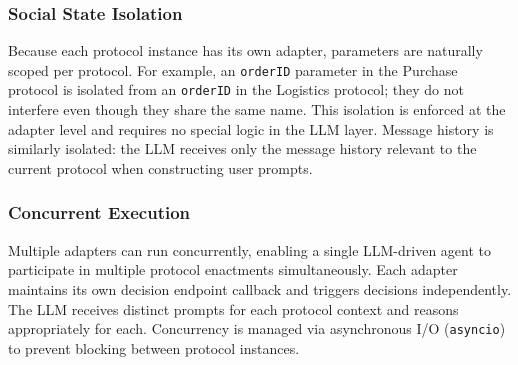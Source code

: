 \documentclass[runningheads]{llncs}
\newcommand{\ahoy}{Ahoy\xspace}
\begin{document}
\subsubsection{Social State Isolation}
Because each protocol instance has its own adapter, parameters are naturally scoped per protocol. 
For example, an \texttt{orderID} parameter in the Purchase protocol is isolated from an \texttt{orderID} in the Logistics protocol; they do not interfere even though they share the same name. 
This isolation is enforced at the adapter level and requires no special logic in the LLM layer. 
Message history is similarly isolated: the LLM receives only the message history relevant to the current protocol when constructing user prompts.

\subsubsection{Concurrent Execution}
Multiple adapters can run concurrently, enabling a single LLM-driven agent to participate in multiple protocol enactments simultaneously. 
Each adapter maintains its own decision endpoint callback and triggers decisions independently. 
The LLM receives distinct prompts for each protocol context and reasons appropriately for each. 
Concurrency is managed via asynchronous I/O (\texttt{asyncio}) to prevent blocking between protocol instances.




\end{document}
